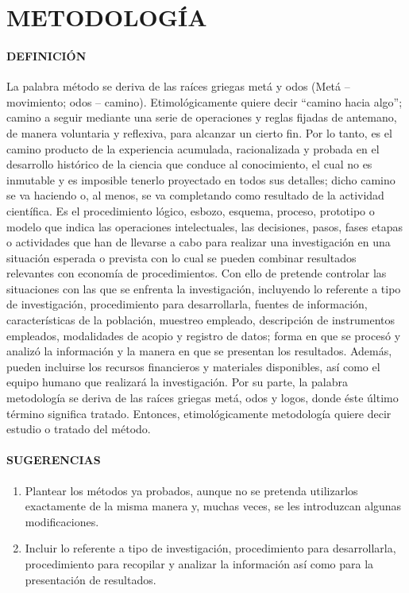 \section{METODOLOGÍA}

\paragraph{DEFINICIÓN}
La palabra método se deriva de las raíces griegas metá y odos (Metá – movimiento; odos – camino). Etimológicamente quiere decir “camino hacia algo”; camino a seguir mediante una serie de operaciones y reglas fijadas de antemano, de manera voluntaria y reflexiva, para alcanzar un cierto fin. Por lo tanto, es el camino producto de la experiencia acumulada, racionalizada y probada en el desarrollo histórico de la ciencia que conduce al conocimiento, el cual no es inmutable y es imposible tenerlo proyectado en todos sus detalles; dicho camino se va haciendo o, al menos, se va completando como resultado de la actividad científica. Es el procedimiento lógico, esbozo, esquema, proceso, prototipo o modelo que indica las operaciones intelectuales, las decisiones, pasos, fases etapas o actividades que han de llevarse a cabo para realizar una investigación en una situación esperada o prevista con lo cual se pueden combinar resultados relevantes con economía de procedimientos. Con ello de pretende controlar las situaciones con las que se enfrenta la investigación, incluyendo lo referente a tipo de investigación, procedimiento para desarrollarla, fuentes de información, características de la población, muestreo empleado, descripción de instrumentos empleados, modalidades de acopio y registro de datos; forma en que se procesó y analizó la información y la manera en que se presentan los resultados. Además, pueden incluirse los recursos financieros y materiales disponibles, así como el equipo humano que realizará la investigación. Por su parte, la palabra metodología se deriva de las raíces griegas metá, odos y logos, donde éste último término significa tratado. Entonces, etimológicamente metodología quiere decir estudio o tratado del método.

\paragraph{SUGERENCIAS}

\begin{enumerate}
 \item Plantear los métodos ya probados, aunque no se pretenda utilizarlos exactamente de la misma manera y, muchas veces, se les introduzcan algunas modificaciones.
 \item Incluir lo referente a tipo de investigación, procedimiento para desarrollarla, procedimiento para recopilar y analizar la información así como para la presentación de resultados.
\end{enumerate}